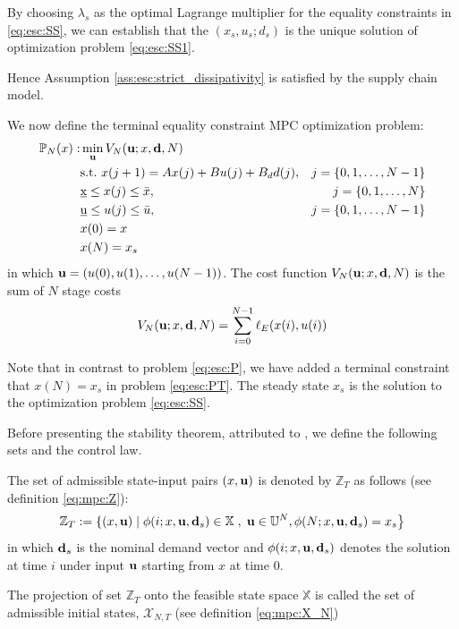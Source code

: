 By choosing $\lambda_s$
as the optimal Lagrange multiplier for the equality constraints in
\eqref{eq:esc:SS}, we can establish that the $(x_s,u_s;d_s)$ is the unique
solution of optimization problem \eqref{eq:esc:SS1}. 

Hence Assumption \ref{ass:esc:strict_dissipativity} is satisfied by the
supply chain model.

We now define the terminal equality constraint MPC optimization
problem:
\begin{alignat}{2}
\label{eq:esc:PT}
\mathbb{P}_N(x):& \min_{\mathbf{u}}{V_N(\mathbf{u};x,\mathbf{d},N)}& \nonumber \\
&\text{s.t.~} x(j+1) = Ax(j) + Bu(j)+B_dd(j),& j =\left\lbrace 0,1,\ldots,N-1 \right\rbrace\nonumber\\
&\underbar{x} \leq x(j) \leq \bar{x},& j =  \left\lbrace 0,1,\ldots,N \right\rbrace  \\
&\underbar{u} \leq u(j) \leq \bar{u},&j = \left\lbrace 0,1,\ldots,N-1 \right\rbrace
\nonumber\\
&x(0) = x & \nonumber \\
&x(N) = x_s & \label{eq:esc:PT:xN}
\end{alignat}
in which $\mathbf{u} = (u(0),u(1),\ldots,u(N-1))$. The cost function
$V_N(\mathbf{u};x,\mathbf{d},N)$ is the sum of $N$ stage costs
\[V_N(\mathbf{u};x,\mathbf{d},N) =  \sum_{i=0}^{N-1}
  \ell_E(x(i),u(i))\]

Note that in contrast to problem \eqref{eq:esc:P},
we have added a terminal constraint that $x(N) = x_s$ in problem
\eqref{eq:esc:PT}. The steady state $x_s$ is the solution to the
optimization problem \eqref{eq:esc:SS}.

Before presenting the stability theorem, attributed to
\citet{diehl:amrit:rawlings:2011}, we define the following sets and
the control law.

The set of admissible state-input pairs $(x,\mathbf{u})$ is denoted by
$\mathbb{Z}_T$ as follows (see  definition  \eqref{eq:mpc:Z}):
\begin{equation}
\mathbb{Z}_T := \left \lbrace(x,\mathbf{u}) \mid \phi(i;x,\mathbf{u},\mathbf{d}_s) \in
  \mathbb{X} \right . ,\\ \left . \mathbf{u} \in \mathbb{U}^N, \phi(N;x,\mathbf{u},\mathbf{d}_s) = x_s\right\rbrace
\end{equation}
in which $\mathbf{d}_s$ is the nominal demand vector and
$\phi(i;x,\mathbf{u},\mathbf{d}_s)$ denotes the solution at time $i$ under input
$\mathbf{u}$ starting from $x$ at time $0$. 

The projection of set $\mathbb{Z}_T$ onto the feasible state space
$\mathbb{X}$ is called the set of admissible initial states,
$\mathcal{X}_{N,T}$ (see definition \eqref{eq:mpc:X_N})

